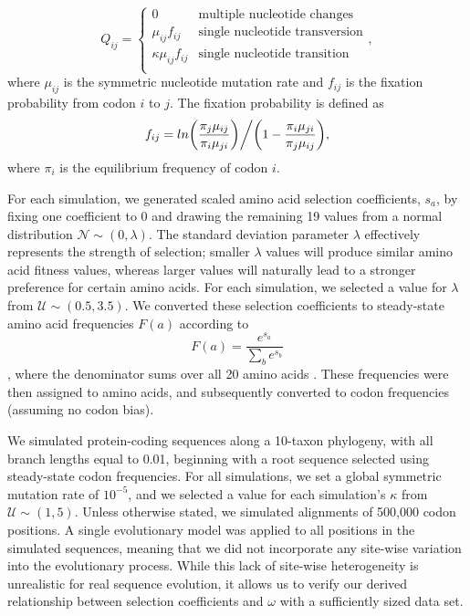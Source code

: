 \documentclass[11pt]{article}
\begin{document}
\begin{equation}
Q_{ij} = \left\{ \begin{array}{rl}
              0                                           &\mbox{multiple nucleotide changes} \\
              \mu_{ij}f_{ij}                          &\mbox{single nucleotide transversion} \\
              \kappa\mu_{ij}f_{ij}               &\mbox{single nucleotide transition} \\
         \end{array} \right.,
\end{equation} where $\mu_{ij}$ is the symmetric nucleotide mutation rate and $f_{ij}$ is the fixation probability from codon $i$ to $j$. The fixation probability is defined as \begin{equation}f_{ij} = ln\bigg{(}\frac{\pi_j\mu_{ij}}{\pi_i\mu_{ji}}\bigg{)}\bigg{/}\bigg{(}1 - \frac{\pi_i\mu_{ji}}{\pi_j\mu_{ij}}\bigg{)},\end{equation} where $\pi_i$ is the equilibrium frequency of codon $i$.

For each simulation, we generated scaled amino acid selection coefficients, $s_a$, by fixing one coefficient to 0 and drawing the remaining 19 values from a normal distribution $\mathcal{N} \sim (0, \lambda)$. The standard deviation parameter $\lambda$ effectively represents the strength of selection; smaller $\lambda$ values will produce similar amino acid fitness values, whereas larger values will naturally lead to a stronger preference for certain amino acids. For each simulation, we selected a value for $\lambda$ from $\mathcal{U} \sim (0.5, 3.5)$.
We converted these selection coefficients to steady-state amino acid frequencies $F(a)$ according to \begin{equation} F(a) = \frac{e^{s_a}}{\sum_b e^{s_b}} \end{equation}, where the denominator sums over all 20 amino acids \cite{Ramseyetal2011}. These frequencies were then assigned to amino acids, and subsequently converted to codon frequencies (assuming no codon bias).

We simulated protein-coding sequences along a 10-taxon phylogeny, with all branch lengths equal to 0.01, beginning with a root sequence selected using steady-state codon frequencies. For all simulations, we set a global symmetric mutation rate of $10^{-5}$, and we selected a value for each simulation's $\kappa$ from $\mathcal{U} \sim (1, 5)$. Unless otherwise stated, we simulated alignments of 500,000 codon positions. A single evolutionary model was applied to all positions in the simulated sequences, meaning that we did not incorporate any site-wise variation into the evolutionary process. While this lack of site-wise heterogeneity is unrealistic for real sequence evolution, it allows us to verify our derived relationship between selection coefficients and $\omega$ with a sufficiently sized data set.
\end{document}
